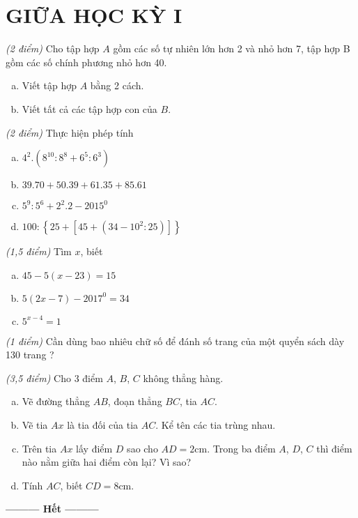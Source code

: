 \section{GIỮA HỌC KỲ I}
\setcounter{ex}{0}
\begin{ex}  \textit{(2 điểm)}
Cho tập hợp $A$ gồm các số tự nhiên lớn hơn 2 và nhỏ hơn 7, tập hợp B gồm các số chính phương nhỏ hơn 40.
\begin{enumerate} [a)]
\item Viết tập hợp $A$ bằng 2 cách.
\item Viết tất cả các tập hợp con của $B$.
\end{enumerate}
\end{ex}    \begin{ex}  \textit{(2 điểm)} Thực hiện phép tính
 \begin{enumerate} [a)]
 \item $4^{2}.(8^{10} : 8^8 + 6^5 : 6^3)$
 \item $39.70 + 50.39 + 61.35 + 85.61$
 \item $5^9 : 5^6 + 2^2. 2 - 2015^0$
 \item $100 : \left\{ 25 + \left[ 45 +  ( 34 - 10^2 : 25 ) \right] \right\}$
 \end{enumerate}
\end{ex}    \begin{ex}  \textit{(1,5 điểm)} Tìm $x$, biết
\begin{enumerate} [a)]
\item $45 - 5 (x - 23)  = 15$
\item $5 (2x - 7) - 2017^0 = 34$
\item $5^{x - 4} = 1$
\end{enumerate}
\end{ex}    \begin{ex}  \textit{(1 điểm)}
Cần dùng bao nhiêu chữ số để đánh số trang của một quyển sách dày 130 trang ?\\
\end{ex}    \begin{ex} \textit{(3,5 điểm)}
Cho 3 điểm $A$, $B$, $C$ không thẳng hàng.
\begin{enumerate} [a)]
\item Vẽ đường thẳng $AB$, đoạn thẳng $BC$, tia $AC$.
\item Vẽ tia $Ax$ là tia đối của tia $AC$. Kể tên các tia trùng nhau.
\item Trên tia $Ax$ lấy điểm $D$ sao cho $AD = 2$cm. Trong ba điểm $A$, $D$, $C$ thì điểm nào nằm giữa hai điểm còn lại? Vì sao?
\item Tính $AC$, biết $CD = 8$cm.
\end{enumerate}
\end{ex}
\begin{center}
\textbf{\textbf{---------} Hết \textbf{---------}}
\end{center}